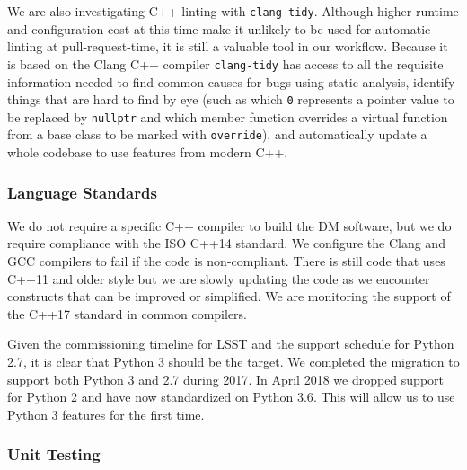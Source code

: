 We are also investigating C++ linting with \texttt{clang-tidy}\cite{clangtidy}. Although higher runtime and configuration cost at this time make it unlikely to be used for automatic linting at pull-request-time, it is still a valuable tool in our workflow.
Because it is based on the Clang C++ compiler \texttt{clang-tidy} has access to all the requisite information needed to find common causes for bugs using static analysis, identify things that are hard to find by eye (such as which \texttt{0} represents a pointer value to be replaced by \texttt{nullptr} and which member function overrides a virtual function from a base class to be marked with \texttt{override}), and automatically update a whole codebase to use features from modern C++.

\subsubsection{Language Standards}

We do not require a specific C++ compiler to build the DM software, but we do require compliance
with the  ISO C++14 standard\cite{cpp14}. We configure the Clang and GCC compilers to fail if the code is non-compliant.
There is still code that uses C++11 and older style but we are slowly updating the code as we encounter constructs that can be improved or simplified.
We are monitoring the support of the C++17 standard in common compilers.

\noindent Given the commissioning timeline for LSST and the support schedule for Python 2.7,
it is clear that Python 3 should be the target. We completed the migration to support both Python 3 and 2.7 during 2017\cite{2016arXiv161100751J}.
In April 2018 we dropped support for Python 2 and have now standardized on Python 3.6\cite{2017arXiv171200461J}.
This will allow us to use Python 3 features for the first time.

\subsubsection{Unit Testing}

